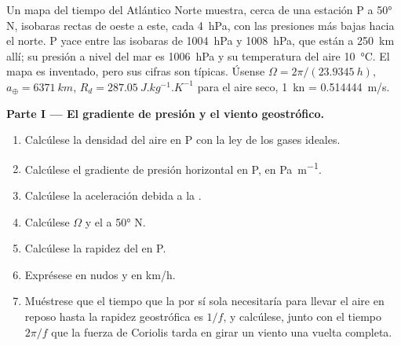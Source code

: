 \begin{problem}
\label{pb:b1:atmospheric-circulation:1}
Un mapa del tiempo del Atlántico Norte muestra, cerca de una estación P a \ang{50} N, isobaras rectas de oeste a este, cada \qty{4}{hPa}, con las presiones más bajas hacia el norte. P yace entre las isobaras de \qty{1004}{hPa} y \qty{1008}{hPa}, que están a \qty{250}{km} allí; su presión a nivel del mar es \qty{1006}{hPa} y su temperatura del aire \qty{10}{\degreeCelsius}. El mapa es inventado, pero sus cifras son típicas.
Úsense $\Omega = 2\pi/(\qty{23.9345}{h})$, $a_\oplus = \qty{6371}{km}$, $R_d =
\qty{287.05}{J.kg^{-1}.K^{-1}}$ para el aire seco, \qty{1}{kn} = \qty{0.514444}{m/s}.

\medskip
\noindent\textbf{Parte I --- El gradiente de presión y el viento geostrófico.}
\begin{enumerate}
  \item Calcúlese la densidad del aire en P con la ley de los gases ideales.
  \item Calcúlese el gradiente de presión horizontal en P, en \unit{Pa.m^{-1}}.
  \item Calcúlese la aceleración debida a la .
  \item Calcúlese $\Omega$ y el  a \ang{50} N.
  \item Calcúlese la rapidez del  en P.
  \item Exprésese en nudos y en \unit{km/h}.
  \item Muéstrese que el tiempo que la  por sí sola necesitaría para llevar el aire en reposo hasta la rapidez geostrófica es $1/f$, y calcúlese, junto con el tiempo $2\pi/f$ que la fuerza de Coriolis tarda en girar un viento una vuelta completa.
\end{enumerate}


\end{problem}
